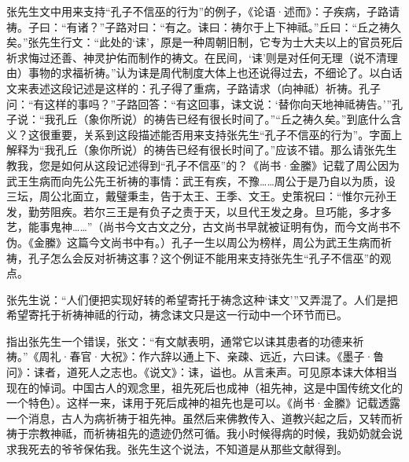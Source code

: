 张先生文中用来支持“孔子不信巫的行为”的例子，《论语·述而》：子疾病，子路请祷。子曰：“有诸？”子路对曰：“有之。诔曰：祷尔于上下神祗。”丘曰：“丘之祷久矣。”张先生行文：“此处的‘诔’，原是一种周朝旧制，它专为士大夫以上的官员死后祈求悔过还善、神灵护佑而制作的祷文。在民间，‘诔’则是对任何无理（说不清理由）事物的求福祈祷。”认为诔是周代制度大体上也还说得过去，不细论了。以白话文来表述这段记述是这样的：孔子得了重病，子路请求（向神祗）祈祷。孔子问：“有这样的事吗？”子路回答：“有这回事，诔文说：‘替你向天地神祗祷告。’”孔子说：“我孔丘（象你所说）的祷告已经有很长时间了。”“丘之祷久矣。”到底什么含义？这很重要，关系到这段描述能否用来支持张先生“孔子不信巫的行为”。字面上解释为“我孔丘（象你所说）的祷告已经有很长时间了。”应该不错。那么请张先生教我，您是如何从这段记述得到“孔子不信巫”的？《尚书·金縢》记载了周公因为武王生病而向先公先王祈祷的事情：武王有疾，不豫……周公于是乃自以为质，设三坛，周公北面立，戴璧秉圭，告于太王、王季、文王。史策祝曰：“惟尔元孙王发，勤劳阻疾。若尔三王是有负子之责于天，以旦代王发之身。旦巧能，多才多艺，能事鬼神……”（尚书今文古文之分，古文尚书早就被证明有伪，而今文尚书不伪。《金縢》这篇今文尚书中有。）孔子一生以周公为榜样，周公为武王生病而祈祷，孔子怎么会反对祈祷这事？这个例证不能用来支持张先生“孔子不信巫”的观点。

张先生说：“人们便把实现好转的希望寄托于祷念这种‘诔文’”又弄混了。人们是把希望寄托于祈祷神祗的行动，祷念诔文只是这一行动中一个环节而已。

指出张先生一个错误，张文：“有文献表明，通常它以诔其患者的功德来祈祷。”《周礼·春官·大祝》：作六辞以通上下、亲疎、远近，六曰诔。《墨子·鲁问》：诔者，道死人之志也。《说文》：诔，谥也。从言耒声。可见原本诔大体相当现在的悼词。中国古人的观念里，祖先死后也成神（祖先神，这是中国传统文化的一个特色）。这样一来，诔用于死后成神的祖先也是可以。《尚书·金縢》记载透露一个消息，古人为病祈祷于祖先神。虽然后来佛教传入、道教兴起之后，又转而祈祷于宗教神祗，而祈祷祖先的遗迹仍然可循。我小时候得病的时候，我奶奶就会说求我死去的爷爷保佑我。张先生这个说法，不知道是从那些文献得到。

